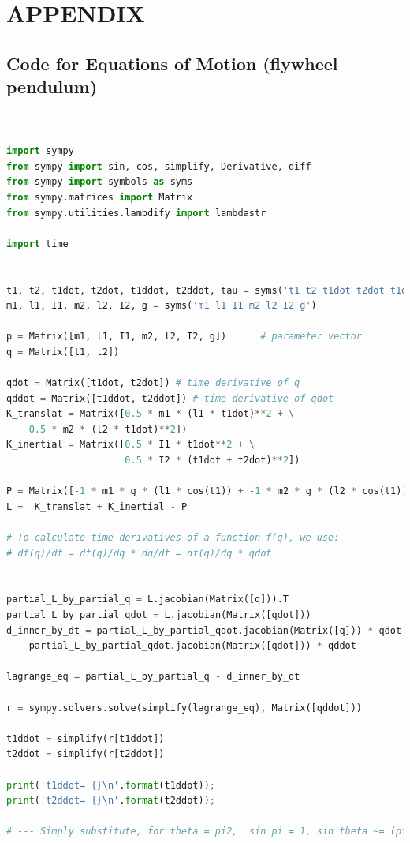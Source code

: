 \documentclass[conference]{IEEEtran}
\begin{document}

\clearpage

\section*{APPENDIX}
\subsection{Code for Equations of Motion (flywheel pendulum)}

\lstset{basicstyle=\footnotesize\ttfamily,breaklines=true}
\begin{lstlisting}[language=Python,frame=single]  % Start your code-block


import sympy
from sympy import sin, cos, simplify, Derivative, diff
from sympy import symbols as syms
from sympy.matrices import Matrix
from sympy.utilities.lambdify import lambdastr

import time


t1, t2, t1dot, t2dot, t1ddot, t2ddot, tau = syms('t1 t2 t1dot t2dot t1ddot t2ddot tau')
m1, l1, I1, m2, l2, I2, g = syms('m1 l1 I1 m2 l2 I2 g')

p = Matrix([m1, l1, I1, m2, l2, I2, g])      # parameter vector
q = Matrix([t1, t2])

qdot = Matrix([t1dot, t2dot]) # time derivative of q
qddot = Matrix([t1ddot, t2ddot]) # time derivative of qdot
K_translat = Matrix([0.5 * m1 * (l1 * t1dot)**2 + \
    0.5 * m2 * (l2 * t1dot)**2])
K_inertial = Matrix([0.5 * I1 * t1dot**2 + \
                     0.5 * I2 * (t1dot + t2dot)**2])

P = Matrix([-1 * m1 * g * (l1 * cos(t1)) + -1 * m2 * g * (l2 * cos(t1))])
L =  K_translat + K_inertial - P

# To calculate time derivatives of a function f(q), we use:
# df(q)/dt = df(q)/dq * dq/dt = df(q)/dq * qdot


partial_L_by_partial_q = L.jacobian(Matrix([q])).T
partial_L_by_partial_qdot = L.jacobian(Matrix([qdot]))
d_inner_by_dt = partial_L_by_partial_qdot.jacobian(Matrix([q])) * qdot + \
    partial_L_by_partial_qdot.jacobian(Matrix([qdot])) * qddot

lagrange_eq = partial_L_by_partial_q - d_inner_by_dt

r = sympy.solvers.solve(simplify(lagrange_eq), Matrix([qddot]))

t1ddot = simplify(r[t1ddot])
t2ddot = simplify(r[t2ddot])

print('t1ddot= {}\n'.format(t1ddot));
print('t2ddot= {}\n'.format(t2ddot));

# --- Simply substitute, for theta = pi2,  sin pi = 1, sin theta ~= (pi - theta )

\end{lstlisting}
\end{document}
